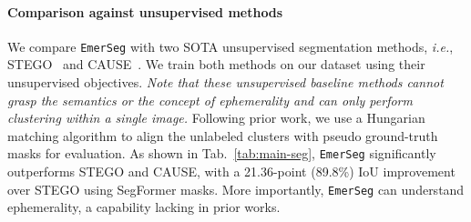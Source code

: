 \paragraph{Comparison against unsupervised methods} We compare \texttt{EmerSeg} with two SOTA unsupervised segmentation methods, \textit{i.e.}, STEGO~\cite{hamilton2022unsupervised} and CAUSE~\cite{kim2023causal}. We train both methods on our dataset using their unsupervised objectives. \textit{Note that these unsupervised baseline methods cannot grasp the semantics or the concept of ephemerality and can only perform clustering within a single image.} Following prior work, we use a Hungarian matching algorithm to align the unlabeled clusters with pseudo ground-truth masks for evaluation. As shown in Tab.~\ref{tab:main-seg}, \texttt{EmerSeg} significantly outperforms STEGO and CAUSE, with a 21.36-point (89.8\%) IoU improvement over STEGO using SegFormer masks. More importantly, \texttt{EmerSeg} can understand ephemerality, a capability lacking in prior works.


